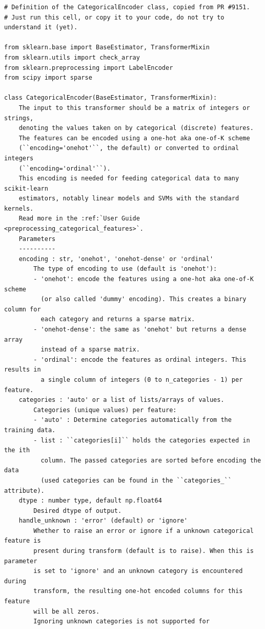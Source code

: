 \documentclass[UTF8]{ctexart}
\begin{document}
\begin{lstlisting}
# Definition of the CategoricalEncoder class, copied from PR #9151.
# Just run this cell, or copy it to your code, do not try to understand it (yet).

from sklearn.base import BaseEstimator, TransformerMixin
from sklearn.utils import check_array
from sklearn.preprocessing import LabelEncoder
from scipy import sparse

class CategoricalEncoder(BaseEstimator, TransformerMixin):
    The input to this transformer should be a matrix of integers or strings,
    denoting the values taken on by categorical (discrete) features.
    The features can be encoded using a one-hot aka one-of-K scheme
    (``encoding='onehot'``, the default) or converted to ordinal integers
    (``encoding='ordinal'``).
    This encoding is needed for feeding categorical data to many scikit-learn
    estimators, notably linear models and SVMs with the standard kernels.
    Read more in the :ref:`User Guide <preprocessing_categorical_features>`.
    Parameters
    ----------
    encoding : str, 'onehot', 'onehot-dense' or 'ordinal'
        The type of encoding to use (default is 'onehot'):
        - 'onehot': encode the features using a one-hot aka one-of-K scheme
          (or also called 'dummy' encoding). This creates a binary column for
          each category and returns a sparse matrix.
        - 'onehot-dense': the same as 'onehot' but returns a dense array
          instead of a sparse matrix.
        - 'ordinal': encode the features as ordinal integers. This results in
          a single column of integers (0 to n_categories - 1) per feature.
    categories : 'auto' or a list of lists/arrays of values.
        Categories (unique values) per feature:
        - 'auto' : Determine categories automatically from the training data.
        - list : ``categories[i]`` holds the categories expected in the ith
          column. The passed categories are sorted before encoding the data
          (used categories can be found in the ``categories_`` attribute).
    dtype : number type, default np.float64
        Desired dtype of output.
    handle_unknown : 'error' (default) or 'ignore'
        Whether to raise an error or ignore if a unknown categorical feature is
        present during transform (default is to raise). When this is parameter
        is set to 'ignore' and an unknown category is encountered during
        transform, the resulting one-hot encoded columns for this feature
        will be all zeros.
        Ignoring unknown categories is not supported for

\end{lstlisting}
\end{document}
